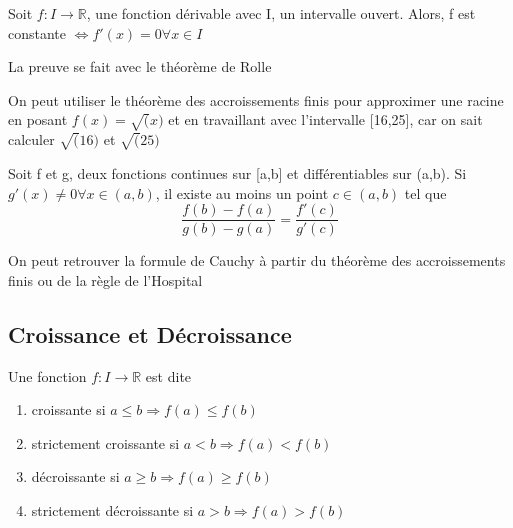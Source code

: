 \documentclass{article}
\begin{document}
\begin{theorem}
    Soit $f:I \to \mathbb{R}$, une fonction dérivable avec I, un
    intervalle ouvert. Alors, f est constante $\Longleftrightarrow
    f'(x)=0 \forall x \in I$
\end{theorem}


\begin{intuition}
    La preuve se fait avec le théorème de Rolle
\end{intuition}

\begin{problem}
    On peut utiliser le théorème des accroissements finis pour
    approximer une racine en posant $f(x)=\sqrt(x)$ et en travaillant
    avec l'intervalle [16,25], car on sait calculer $\sqrt(16)$ et
    $\sqrt(25)$
\end{problem}

\begin{corollary}
    Soit f et g, deux fonctions continues sur [a,b] et différentiables
    sur (a,b). Si $g'(x) \neq 0 \forall x \in (a,b)$, il existe au moins
    un point $c \in (a,b)$ tel que
    $$ \frac{f(b)- f(a)}{g(b)-g(a)} = \frac{f'(c)}{g'(c)}$$
\end{corollary}

\begin{remark}
    On peut retrouver la formule de Cauchy à partir du théorème des
    accroissements finis ou de la règle de l'Hospital
\end{remark}

\subsection{Croissance et Décroissance}

\begin{definition}
    Une fonction $f:I \to \mathbb{R}$ est dite
    \begin{enumerate}
	\item croissante si $a \leq b \Longrightarrow f(a) \leq f(b)$
	\item strictement croissante si
	    $a < b \Longrightarrow f(a) < f(b)$
	\item décroissante si $a \geq b \Longrightarrow f(a) \geq f(b)$
	\item strictement décroissante si
	    $a > b \Longrightarrow f(a) > f(b)$
    \end{enumerate}
\end{definition}
\end{document}
